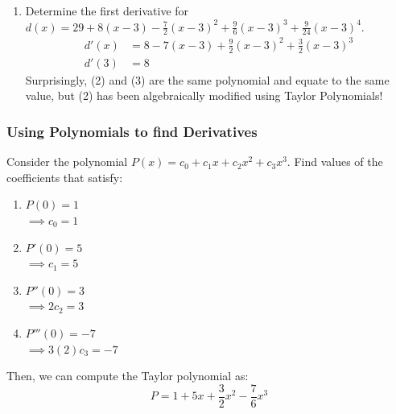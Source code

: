 \documentclass{article}
\begin{document}
\begin{enumerate}
    \item Determine the first derivative for $d(x) = 29 + 8(x-3) - \frac{7}{2}(x-3)^2 + \frac{9}{6}(x-3)^3 + \frac{9}{24}(x-3)^4$.
    \begin{align*}
        d'(x) & = 8 - 7(x-3) + \frac{9}{2}(x-3)^2 + \frac{3}{2}(x-3)^3\\
        d'(3) & = 8
    \end{align*}
    Surprisingly, (2) and (3) are the same polynomial and equate to the same value, but (2) has been algebraically modified using Taylor Polynomials!
\end{enumerate}

\subsubsection{Using Polynomials to find Derivatives}
Consider the polynomial $P(x) = c_0 + c_1 x + c_2 x^2+ c_3 x^3$. Find values of the coefficients that satisfy:
    \begin{enumerate}
        \item $P(0) = 1$\\
        $\implies c_0 = 1$
        
        \item $P'(0) = 5$\\
        $\implies c_1 = 5$
        
        \item $P''(0) = 3$\\
        $\implies 2 c_2 = 3$
        
        \item $P'''(0) = -7$\\
        $\implies 3(2)c_3 = -7$
    \end{enumerate}
Then, we can compute the Taylor polynomial as:
$$P = 1 + 5x + \frac{3}{2}x^2 - \frac{7}{6}x^3$$
\end{document}
